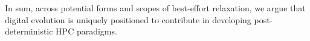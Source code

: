 {In sum, across potential forms and scopes of best-effort relaxation, we argue that digital evolution is uniquely positioned to contribute in developing post-deterministic HPC paradigms.
}
